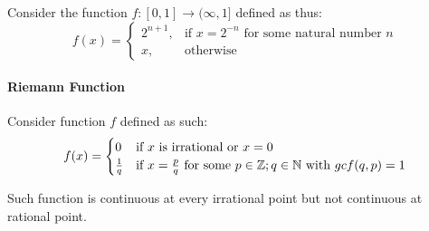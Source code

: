 \documentclass[../note.tex]{subfiles}
\begin{document}
Consider the function $f:[0,1] \rightarrow (\infty, 1]$ defined as thus:
\[
    f(x)= 
\begin{cases}
	2^{n+1},& \text{if } x=2^{-n} \text{ for some natural number }n\\
    x,              & \text{otherwise}
\end{cases}
\]


\paragraph{Riemann Function} \label{RiemannFunction} \hypertarget{RiemannFunction}{}
Consider function $f$ defined as such:
\[
	f(x)=
	\begin{cases}
		0 & \text{if } x \text{ is irrational or } x=0 \\
		\frac{1}{q} & \text{if } x=\frac{p}{q} \text{ for some } p \in \mathbb{Z}; q \in \mathbb{N} \text{ with } gcf(q, p)=1  \\ 
	\end{cases}
\]

Such function is continuous at every irrational point but not continuous at rational point.
\end{document}
